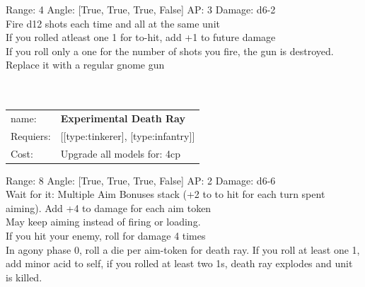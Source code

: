 Range: 4  Angle: [True, True, True, False] AP: 3 Damage: d6-2 \\
Fire d12 shots each time and all at the same unit\\ 
If you rolled atleast one 1 for to-hit, add +1 to future damage\\ 
If you roll only a one for the number of shots you fire, the gun is destroyed. Replace it with a regular gnome gun\\ 








\ \\
\ \\
\begin{tabular}{ll}
name: & {\bf Experimental Death Ray } \\
Requiers: & [[type:tinkerer], [type:infantry]] \\
Cost: & Upgrade all models for: 4cp \\
\end{tabular}



Range: 8  Angle: [True, True, True, False] AP: 2 Damage: d6-6 \\
Wait for it: Multiple Aim Bonuses stack (+2 to to hit for each turn spent aiming). Add +4 to damage for each aim token\\ 
May keep aiming instead of firing or loading.\\ 
If you hit your enemy, roll for damage 4 times\\ 
In agony phase 0, roll a die per aim-token for death ray. If you roll at least one 1, add minor acid to self, if you rolled at least two 1s, death ray explodes and unit is killed.\\ 








\ \\
